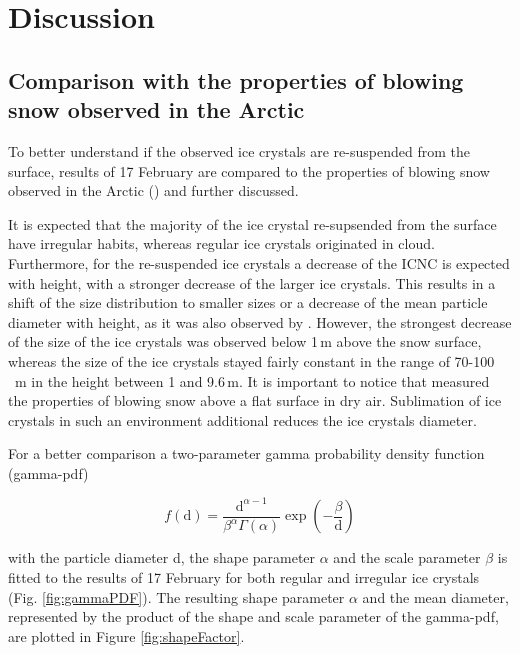 \documentclass[draft,linenumbers]{agujournal}
\begin{document}
\section{Discussion}
\label{Discussion}

\subsection{Comparison with the properties of blowing snow observed in the Arctic}
\label{Discussion_comp} 
To better understand if the observed ice crystals are re-suspended from the surface, results of 17 February are compared to the properties of blowing snow observed in the Arctic (\citep{Nis05}) and further discussed. 

It is expected that the majority of the ice crystal re-supsended from the surface have irregular habits, whereas regular ice crystals originated in cloud. Furthermore, for the re-suspended ice crystals a decrease of the ICNC is expected with height, with a stronger decrease of the larger ice crystals. This results in a shift of the size distribution to smaller sizes or a decrease of the mean particle diameter with height, as it was also observed by \citet{Nis05}. However, the strongest decrease of the size of the ice crystals was observed below 1\,\si{m} above the snow surface, whereas the size of the ice crystals stayed fairly constant in the range of 70-100\,\si{\mu m} in the height between 1 and 9.6\,\si{m}. It is important to notice that \citet{Nis05} measured the properties of blowing snow above a flat surface in dry air. Sublimation of ice crystals in such an environment additional reduces the ice crystals diameter. 

For a better comparison a two-parameter gamma probability density function (gamma-pdf)\citep{Bud66, Sch82} 

\begin{linenomath*}
\begin{equation}
f(\text{d}) = \frac{\text{d}^{\alpha - 1}}{\beta^{\alpha} \Gamma\left(\alpha\right)}\exp\left(-\frac{\beta}{\text{d}}\right) 
\end{equation}
\end{linenomath*}

with the particle diameter d, the shape parameter $\alpha$ and the scale parameter $\beta$ is fitted to the results of 17 February for both regular and irregular ice crystals (Fig. \ref{fig:gammaPDF}). The resulting shape parameter $\alpha$ and the mean diameter, represented by the product of the shape and scale parameter of the gamma-pdf, are plotted in Figure \ref{fig:shapeFactor}. 
\end{document}
